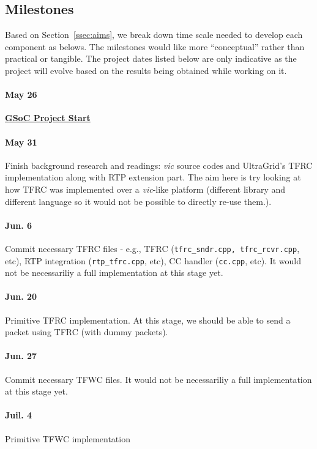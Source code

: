 \subsection{\label{ssec:plan}Milestones}

Based on Section~\ref{ssec:aims}, we break down time scale needed to develop
each component as belows. The milestones would like more ``conceptual'' rather
than practical or tangible. The project dates listed below are only indicative
as the project will evolve based on the results being obtained while working on
it.

\paragraph{\textsf{May 26}} \underline{\textbf{GSoC Project Start}}

\paragraph{\textsf{May 31}} Finish background research and readings: \emph{vic} source
codes and UltraGrid's TFRC implementation along with RTP extension part.  The
aim here is try looking at how TFRC was implemented over a \emph{vic}-like platform
(different library and different language so it would not be possible to
directly re-use them.).

\paragraph{\textsf{Jun. 6}} Commit necessary TFRC files - e.g., TFRC
(\texttt{tfrc\_sndr.cpp, tfrc\_rcvr.cpp}, etc), RTP integration
(\texttt{rtp\_tfrc.cpp}, etc), CC handler (\texttt{cc.cpp}, etc). It would not
be necessariliy a full implementation at this stage yet.

\paragraph{\textsf{Jun. 20}} Primitive TFRC implementation. At this stage, we
should be able to send a packet using TFRC (with dummy packets).

\paragraph{\textsf{Jun. 27}} Commit necessary TFWC files. It would not be
necessariliy a full implementation at this stage yet.

\paragraph{\textsf{Juil. 4}} Primitive TFWC implementation

